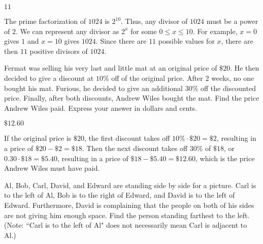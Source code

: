 \documentclass[11pt]{article}
\begin{document}
\begin{answer}
$\boxed{11}$
\end{answer}

\begin{solution}
The prime factorization of $1024$ is $2^{10}$. Thus, any divisor of $1024$ must be a power of $2$. We can represent any divisor as $2^x$ for some $0 \le x \le 10$. For example, $x=0$ gives $1$ and $x=10$ gives $1024$. Since there are $11$ possible values for $x$, there are then $\boxed{11}$ positive divisors of $1024$. 
\end{solution}


\begin{problem} %
Fermat was selling his very last and little mat at an original price of $\$20$. He then decided to give a discount at $10\%$ off of the original price. After 2 weeks, no one bought his mat. Furious, he decided to give an additional $30\%$ off the discounted price. Finally, after both discounts, Andrew Wiles bought the mat. Find the price Andrew Wiles paid. Express your answer in dollars and cents.
\end{problem}

\begin{answer}
$\boxed{\$12.60}$
\end{answer}

\begin{solution}
If the original price is $\$20$, the first discount takes off $10\% \cdot \$20  = \$2$, resulting in a price of $\$20 - \$2 = \$18$. Then the next discount takes off $30\%$ of $\$18$, or $0.30 \cdot \$18 = \$5.40$, resulting in a price of $\$18 - \$5.40 = \boxed{\$12.60}$, which is the price Andrew Wiles must have paid. 
\end{solution}


\begin{problem}

Al, Bob, Carl, David, and Edward are standing side by side for a picture. Carl is to the left of Al, Bob is to the right of Edward, and David is to the left of Edward. Furthermore, David is complaining that the people on both of his sides are not giving him enough space. Find the person standing farthest to the left. (Note: ``Carl is to the left of Al" does not necessarily mean Carl is adjacent to Al.)
\end{problem}
\end{document}
